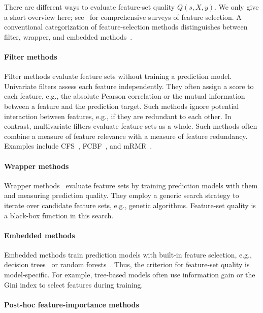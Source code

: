 \documentclass{article}
\theoremstyle{definition}
\begin{document}
There are different ways to evaluate feature-set quality $Q(s,X,y)$.
We only give a short overview here; see~\cite{chandrashekar2014survey,li2017feature} for comprehensive surveys of feature selection.
A conventional categorization of feature-selection methods distinguishes between filter, wrapper, and embedded methods~\cite{guyon2003introduction}.

\paragraph{Filter methods}

Filter methods evaluate feature sets without training a prediction model.
Univariate filters assess each feature independently.
They often assign a score to each feature, e.g., the absolute Pearson correlation or the mutual information between a feature and the prediction target.
Such methods ignore potential interaction between features, e.g., if they are redundant to each other.
In contrast, multivariate filters evaluate feature sets as a whole.
Such methods often combine a measure of feature relevance with a measure of feature redundancy.
Examples include CFS~\cite{hall1999correlation, hall2000correlation}, FCBF~\cite{yu2003feature}, and mRMR~\cite{peng2005feature}.

\paragraph{Wrapper methods}

Wrapper methods~\cite{kohavi1997wrappers} evaluate feature sets by training prediction models with them and measuring prediction quality.
They employ a generic search strategy to iterate over candidate feature sets, e.g., genetic algorithms.
Feature-set quality is a black-box function in this search.

\paragraph{Embedded methods}

Embedded methods train prediction models with built-in feature selection, e.g., decision trees~\cite{breiman1984classification} or random forests~\cite{breiman2001random}.
Thus, the criterion for feature-set quality is model-specific.
For example, tree-based models often use information gain or the Gini index to select features during training.

\paragraph{Post-hoc feature-importance methods}
\end{document}
